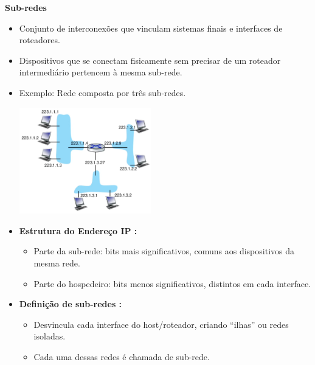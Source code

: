            \textbf{Sub-redes}

                \begin{itemize}[left=0.5cm, align=left, nosep]
                    \item Conjunto de interconexões que vinculam sistemas finais e interfaces de roteadores.
                    \item Dispositivos que se conectam fisicamente sem precisar de um roteador intermediário pertencem à mesma sub-rede.
                    \item Exemplo: Rede composta por três sub-redes.

                    \begin{center}
                        \includegraphics[width=0.45\textwidth]{img/cap-04/introducao-endereco-ip.png}
                    \end{center}

                    \item \textbf{Estrutura do Endereço IP :}
                    \begin{itemize}[left=0.5cm, nosep, label=$\hookrightarrow$]
                        \item Parte da sub-rede: bits mais significativos, comuns aos dispositivos da mesma rede.
                        \item Parte do hospedeiro: bits menos significativos, distintos em cada interface.
                    \end{itemize}

                    \item \textbf{Definição de sub-redes :}
                    \begin{itemize}[left=0.5cm, nosep, label=$\hookrightarrow$]
                        \item Desvincula cada interface do host/roteador, criando “ilhas” ou redes isoladas.
                        \item Cada uma dessas redes é chamada de sub-rede.
                    \end{itemize}


\end{itemize}
